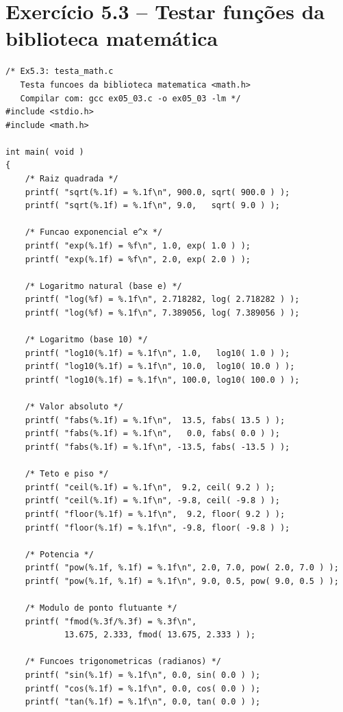 \documentclass[12pt,a4paper]{article}
\begin{document}
\section{Exercício 5.3 -- Testar funções da biblioteca matemática}

\begin{respostabox}
\begin{lstlisting}
/* Ex5.3: testa_math.c
   Testa funcoes da biblioteca matematica <math.h>
   Compilar com: gcc ex05_03.c -o ex05_03 -lm */
#include <stdio.h>
#include <math.h>

int main( void )
{
    /* Raiz quadrada */
    printf( "sqrt(%.1f) = %.1f\n", 900.0, sqrt( 900.0 ) );
    printf( "sqrt(%.1f) = %.1f\n", 9.0,   sqrt( 9.0 ) );

    /* Funcao exponencial e^x */
    printf( "exp(%.1f) = %f\n", 1.0, exp( 1.0 ) );
    printf( "exp(%.1f) = %f\n", 2.0, exp( 2.0 ) );

    /* Logaritmo natural (base e) */
    printf( "log(%f) = %.1f\n", 2.718282, log( 2.718282 ) );
    printf( "log(%f) = %.1f\n", 7.389056, log( 7.389056 ) );

    /* Logaritmo (base 10) */
    printf( "log10(%.1f) = %.1f\n", 1.0,   log10( 1.0 ) );
    printf( "log10(%.1f) = %.1f\n", 10.0,  log10( 10.0 ) );
    printf( "log10(%.1f) = %.1f\n", 100.0, log10( 100.0 ) );

    /* Valor absoluto */
    printf( "fabs(%.1f) = %.1f\n",  13.5, fabs( 13.5 ) );
    printf( "fabs(%.1f) = %.1f\n",   0.0, fabs( 0.0 ) );
    printf( "fabs(%.1f) = %.1f\n", -13.5, fabs( -13.5 ) );

    /* Teto e piso */
    printf( "ceil(%.1f) = %.1f\n",  9.2, ceil( 9.2 ) );
    printf( "ceil(%.1f) = %.1f\n", -9.8, ceil( -9.8 ) );
    printf( "floor(%.1f) = %.1f\n",  9.2, floor( 9.2 ) );
    printf( "floor(%.1f) = %.1f\n", -9.8, floor( -9.8 ) );

    /* Potencia */
    printf( "pow(%.1f, %.1f) = %.1f\n", 2.0, 7.0, pow( 2.0, 7.0 ) );
    printf( "pow(%.1f, %.1f) = %.1f\n", 9.0, 0.5, pow( 9.0, 0.5 ) );

    /* Modulo de ponto flutuante */
    printf( "fmod(%.3f/%.3f) = %.3f\n",
            13.675, 2.333, fmod( 13.675, 2.333 ) );

    /* Funcoes trigonometricas (radianos) */
    printf( "sin(%.1f) = %.1f\n", 0.0, sin( 0.0 ) );
    printf( "cos(%.1f) = %.1f\n", 0.0, cos( 0.0 ) );
    printf( "tan(%.1f) = %.1f\n", 0.0, tan( 0.0 ) );


\end{lstlisting}
\end{respostabox}
\end{document}
